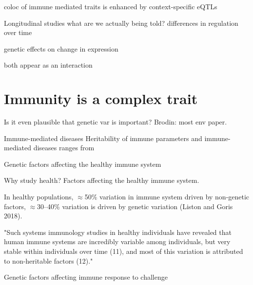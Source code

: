 \begin{outline}



coloc of immune mediated traits is enhanced by context-specific eQTLs



Longitudinal studies
    what are we actually being told?
    differences in regulation over time

    genetic effects on change in expression

    both appear as an interaction

\section{Immunity is a complex trait}

Is it even plausible that genetic var is important?
    Brodin: most env paper.

Immune-mediated diseases
    Heritability of immune parameters and immune-mediated diseases
        ranges from 


Genetic factors affecting the healthy immune system

    Why study health?
    Factors affecting the healthy immune system.

    In healthy populations, $\approx$50\% variation in immune system driven by non-genetic factors, $\approx$30–40\% variation is driven by genetic variation (Liston and Goris 2018).

    "Such systems  immunology studies in  healthy individuals have  revealed that human immune  systems are incredibly  variable among individuals,  but very stable within  individuals over time (11),  and most of this variation is  attributed to non-heritable  factors (12)."

Genetic factors affecting immune response to challenge


\end{outline}
